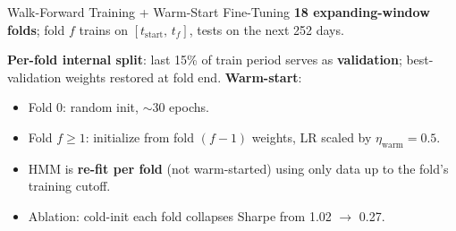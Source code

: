 \documentclass[10pt, aspectratio=169]{beamer}
\begin{document}
\begin{frame}{Walk-Forward Training + Warm-Start Fine-Tuning}
\textbf{18 expanding-window folds}; fold $f$ trains on $[t_{\text{start}},\,t_f]$, tests on the next 252 days.
\vspace{0.2em}
\begin{center}
\end{center}
\vspace{0.1em}
\textbf{Per-fold internal split}: last 15\% of train period serves as \textbf{validation}; best-validation weights restored at fold end.
\vspace{0.3em}
\textbf{Warm-start}:
\begin{itemize}\setlength{\itemsep}{2pt}\footnotesize
  \item Fold 0: random init, $\sim$30 epochs.
  \item Fold $f \geq 1$: initialize from fold $(f{-}1)$ weights, LR scaled by $\eta_{\text{warm}}=0.5$.
  \item HMM is \textbf{re-fit per fold} (not warm-started) using only data up to the fold's training cutoff.
  \item Ablation: cold-init each fold collapses Sharpe from 1.02 $\to$ 0.27.
\end{itemize}
\end{frame}
\end{document}
